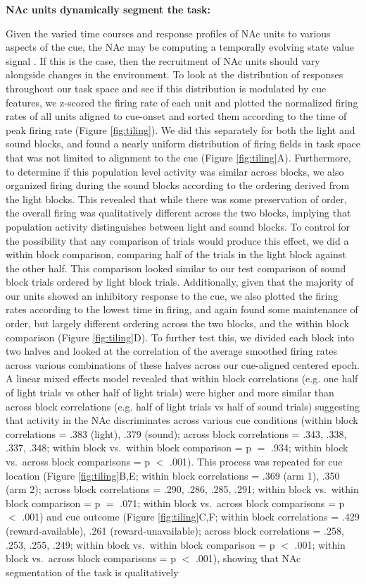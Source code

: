 \documentclass[11pt]{article}
\let\cite=\citep
\begin{document}
{\bf NAc units dynamically segment the task:}

Given the varied time courses and response profiles of NAc units to various
aspects of the cue, the NAc may be computing a temporally evolving state value
signal \cite{Pennartz2011}. If this is the case, then the recruitment of NAc units
should vary alongside changes in the environment. To look at the distribution of
responses throughout our task space and see if this distribution is modulated by
cue features, we z-scored the firing rate of each unit and plotted the
normalized firing rates of all units aligned to cue-onset and sorted them
according to the time of peak firing rate (Figure \ref{fig:tiling}). We did this
separately for both the light and sound blocks, and found a nearly uniform
distribution of firing fields in task space that was not limited to alignment to
the cue (Figure \ref{fig:tiling}A). Furthermore, to determine if this population
level activity was similar across blocks, we also organized firing during the
sound blocks according to the ordering derived from the light blocks. This revealed that while there was some preservation of order, the overall firing was qualitatively different
across the two blocks, implying that population activity distinguishes between light and sound blocks. To control for the possibility that any comparison of
trials would produce this effect, we did a within block comparison, comparing
half of the trials in the light block against the other half. This comparison
looked similar to our test comparison of sound block trials ordered by light
block trials. Additionally, given that the majority of our units showed an
inhibitory response to the cue, we also plotted the firing rates according to
the lowest time in firing, and again found some maintenance of order, but
largely different ordering across the two blocks, and the within block
comparison (Figure \ref{fig:tiling}D). To further test this, we divided each
block into two halves and looked at the correlation of the average smoothed
firing rates across various combinations of these halves across our cue-aligned
centered epoch. A linear mixed effects model revealed that within block
correlations (e.g. one half of light trials vs other half of light trials) were
higher and more similar than across block correlations (e.g. half of light
trials vs half of sound trials) suggesting that activity in the NAc
discriminates across various cue conditions (within block correlations = .383 (light), .379 (sound); across block correlations = .343, .338, .337, .348; within block vs.\ within block comparison = p $=$ .934; within block vs.\ across block comparisons = p $<$ .001). This process was repeated for cue location (Figure \ref{fig:tiling}B,E; within block correlations = .369 (arm 1), .350 (arm 2); across block correlations = .290, .286, .285, .291; within block vs.\ within block comparison = p $=$ .071; within block vs.\ across block comparisons = p $<$ .001) and cue outcome (Figure \ref{fig:tiling}C,F;  within block correlations = .429 (reward-available), .261 (reward-unavailable); across block correlations = .258, .253, .255, .249; within block vs.\ within block comparison = p $<$ .001; within block vs.\ across block comparisons = p $<$ .001), showing that NAc segmentation of the task is qualitatively
\end{document}
